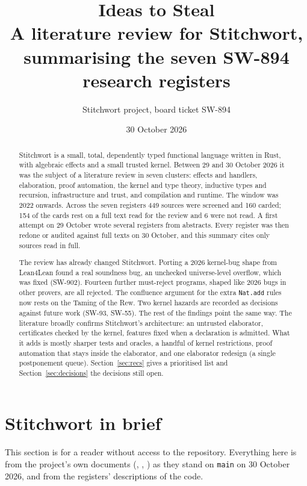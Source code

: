 \documentclass[11pt,a4paper]{article}
\title{\color{swblue}\textbf{Ideas to Steal}\\[4pt]
  \large A literature review for Stitchwort, summarising the seven SW-894 research registers}
\author{Stitchwort project, board ticket SW-894}
\date{30 October 2026}
\newcommand{\code}[1]{\texttt{#1}}
\newcommand{\file}[1]{\path{#1}}
\begin{document}
\maketitle
\thispagestyle{empty}

\begin{abstract}
\noindent
Stitchwort is a small, total, dependently typed functional language written in Rust, with
algebraic effects and a small trusted kernel. Between 29 and 30 October 2026 it was the subject
of a literature review in seven clusters: effects and handlers, elaboration, proof automation,
the kernel and type theory, inductive types and recursion, infrastructure and trust, and
compilation and runtime. The window was 2022 onwards. Across the seven registers 449 sources were
screened and 160 carded; 154 of the cards rest on a full text read for the review and 6 were not
read. A first attempt on 29 October wrote several registers from abstracts. Every register was
then redone or audited against full texts on 30 October, and this summary cites only sources
read in full.

The review has already changed Stitchwort. Porting a 2026 kernel-bug shape from Lean4Lean
found a real soundness bug, an unchecked universe-level overflow, which was fixed (SW-902).
Fourteen further must-reject programs, shaped like 2026 bugs in other provers, are all rejected.
The confluence argument for the extra \code{Nat.add} rules now rests on the Taming of the Rew.
Two kernel hazards are recorded as decisions against future work (SW-93, SW-55). The rest of the
findings point the same way. The literature broadly confirms Stitchwort's architecture: an
untrusted elaborator, certificates checked by the kernel, features fixed when a declaration is
admitted. What it adds is mostly sharper tests and oracles, a handful of kernel restrictions,
proof automation that stays inside the elaborator, and one elaborator redesign (a single
postponement queue). Section~\ref{sec:recs} gives a prioritised list and
Section~\ref{sec:decisions} the decisions still open.
\end{abstract}

\tableofcontents
\clearpage

\section{Stitchwort in brief}\label{sec:brief}

This section is for a reader without access to the repository. Everything here is from the
project's own documents (\file{README.md}, \file{DESIGN.md}, \file{docs/core.md}) as they stand on
\code{main} on 30 October 2026, and from the registers' descriptions of the code.
\end{document}
